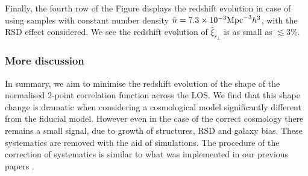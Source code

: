 \documentclass[iop]{emulateapj}
\begin{document}
Finally, the fourth row of the Figure displays the 
redshift evolution in case of using samples with constant number density $\bar n=7.3\times 10^{-3} {\rm Mpc}^{-3}h^3$, 
with the RSD effect considered. %
We see the redshift evolution of $\hat \xi_{r_\perp}$ is as small as $\lesssim3\%$.









\subsubsection{More discussion}

In summary, we aim to minimise the redshift evolution of the shape of the normalised  2-point correlation function across the LOS. We find that this shape change is dramatic when considering a cosmological model significantly different from the fiducial model.
However even in the case of the correct cosmology there remains a small signal, due to growth of structures, RSD and galaxy bias. These systematics are removed with the aid of simulations.
The procedure of the correction of systematics is similar to what was implemented in our previous papers \cite{Li2014,Li2015,Li2016}.
\end{document}
